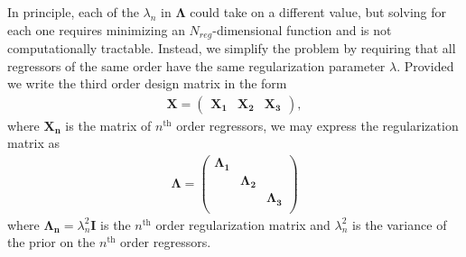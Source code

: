 \documentclass[]{emulateapj}
\begin{document}
In principle, each of the $\lambda_n$ in $\mathbf{\Lambda}$ could take on a different value, 
but solving for each one requires minimizing an $N_{reg}$-dimensional function and is not computationally tractable.
Instead, we simplify the problem by requiring that all regressors of the same order have the
same regularization parameter $\lambda$. Provided we write the third order design matrix in the form
%
\begin{align}
\label{eq:design}
\mathbf{X} = 
\left(
\begin{array}{ccc}
  \mathbf{X_1} & \mathbf{X_2} & \mathbf{X_3}
\end{array}
\right),
\end{align}
%
where $\mathbf{X_n}$ is the matrix of $n^\mathrm{th}$ order regressors, we may
express the regularization matrix as
%
\begin{align}
\label{eq:Lambda_block}
\mathbf{\Lambda} = 
\left(
\begin{array}{ccc}
  \mathbf{\Lambda_1}      &                       & \\
  &                       \mathbf{\Lambda_2}      & \\
  &                       &                       \mathbf{\Lambda_3} \\
\end{array}
\right)
\end{align}
%
where $\mathbf{\Lambda_n} = \lambda_{n}^2\mathbf{I}$ is the 
$n^\mathrm{th}$ order regularization matrix and $\lambda_{n}^2$ is the variance
of the prior on the $n^\mathrm{th}$ order regressors. 
\end{document}

